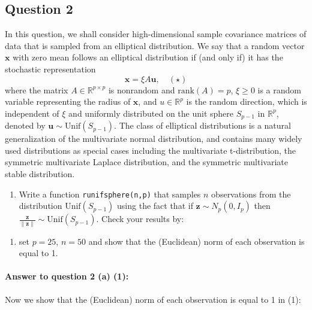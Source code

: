 \documentclass[
]{article}
\providecommand{\tightlist}{%
  \setlength{\itemsep}{0pt}\setlength{\parskip}{0pt}}
\begin{document}
\subsection{Question 2}\label{question-2}

In this question, we shall consider high-dimensional sample covariance
matrices of data that is sampled from an elliptical distribution. We say
that a random vector \(\mathbf{x}\) with zero mean follows an elliptical
distribution if (and only if) it has the stochastic representation
\[ \mathbf{x} = \xi A \mathbf{u}, \quad (\star) \]where the matrix
\(A \in \mathbb{R}^{p \times p}\) is nonrandom and
\(\text{rank}(A) = p\), \(\xi \geq 0\) is a random variable representing
the radius of \(\mathbf{x}\), and \(u \in \mathbb{R}^p\) is the random
direction, which is independent of \(\xi\) and uniformly distributed on
the unit sphere \(S_{p-1}\) in \(\mathbb{R}^p\), denoted by
\(\mathbf{u} \sim \text{Unif}(S_{p-1})\). The class of elliptical
distributions is a natural generalization of the multivariate normal
distribution, and contains many widely used distributions as special
cases including the multivariate t-distribution, the symmetric
multivariate Laplace distribution, and the symmetric multivariate stable
distribution.

\begin{enumerate}
\def\labelenumi{(\alph{enumi})}
\tightlist
\item
  Write a function \texttt{runifsphere(n,p)} that samples \(n\)
  observations from the distribution \(\text{Unif}(S_{p-1})\) using the
  fact that if \(\mathbf{z} \sim N_p(0, I_p)\) then
  \(\frac{\mathbf{z}}{\| \mathbf{z} \|} \sim \text{Unif}(S_{p-1})\).
  Check your results by:
\end{enumerate}

\begin{enumerate}
\def\labelenumi{\arabic{enumi}.}
\tightlist
\item
  set \(p = 25\), \(n = 50\) and show that the (Euclidean) norm of each
  observation is equal to 1.
\end{enumerate}

\paragraph{\texorpdfstring{\textbf{Answer to question 2 (a)
(1)}:}{Answer to question 2 (a) (1):}}\label{answer-to-question-2-a-1}

Now we show that the (Euclidean) norm of each observation is equal to 1
in (1):
\end{document}
